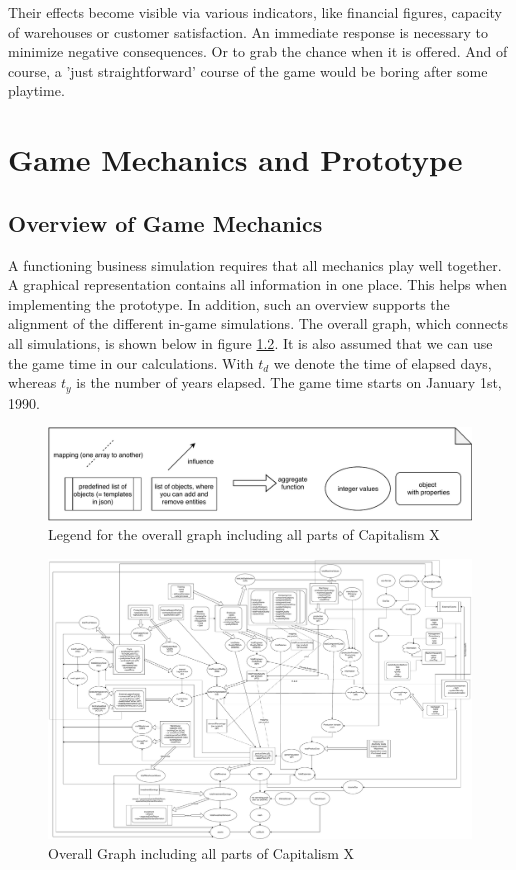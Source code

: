 \documentclass[11pt,titlepage,oneside,openany]{book}
\begin{document}
Their effects become visible via various indicators, like financial figures, capacity of warehouses or customer satisfaction. An immediate response is necessary to minimize negative consequences. Or to grab the chance when it is offered. And of course, a 'just straightforward' course of the game would be boring after some playtime. 

\chapter{Game Mechanics and Prototype}
\label{cha:alg}

\section{Overview of Game Mechanics} 
\label{sec:link}

A functioning business simulation requires that all mechanics play well together. A graphical representation contains all information in one place. This helps when implementing the prototype. In addition, such an overview supports the alignment of the different in-game simulations. The overall graph, which connects all simulations, is shown below in figure \ref{fig:OverallGraph}. 
It is also assumed that we can use the game time in our calculations. With $t_d$ we denote the time of elapsed days, whereas $t_y$ is the number of years elapsed. The game time starts on January 1st, 1990. 

\begin{figure}[H]
    \centering
    \includegraphics[width=\textwidth]{fullGraph_legend.pdf}
    \caption{Legend for the overall graph including all parts of Capitalism X}
    \label{fig:OverallGraphLegend}
\end{figure}

\begin{figure}[H]
    \includegraphics[angle=90, width=\textwidth]{fullGraph.pdf}
    \caption{Overall Graph including all parts of Capitalism X}
    \label{fig:OverallGraph}
\end{figure}
\end{document}
